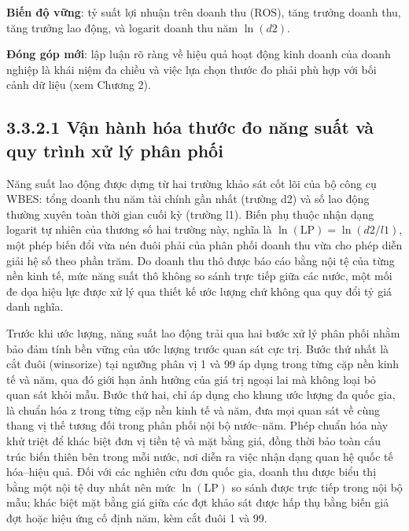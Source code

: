 \documentclass[
  a4paper,
  13pt]{extreport}
\begin{document}
\textbf{Biến độ vững}: tỷ suất lợi nhuận trên doanh thu
(\(\mathrm{ROS}\)), tăng trưởng doanh thu, tăng trưởng lao động, và
logarit doanh thu năm \(\ln(d2)\).

\textbf{Đóng góp mới}: lập luận rõ ràng về hiệu quả hoạt động kinh doanh
của doanh nghiệp là khái niệm đa chiều và việc lựa chọn thước đo phải
phù hợp với bối cảnh dữ liệu (xem Chương 2).

\hypertarget{vux1eadn-huxe0nh-huxf3a-thux1b0ux1edbc-ux111o-nux103ng-suux1ea5t-vuxe0-quy-truxecnh-xux1eed-luxfd-phuxe2n-phux1ed1i}{%
\subsection{3.3.2.1 Vận hành hóa thước đo năng suất và quy trình xử lý
phân
phối}\label{vux1eadn-huxe0nh-huxf3a-thux1b0ux1edbc-ux111o-nux103ng-suux1ea5t-vuxe0-quy-truxecnh-xux1eed-luxfd-phuxe2n-phux1ed1i}}

Năng suất lao động được dựng từ hai trường khảo sát cốt lõi của bộ công
cụ WBES: tổng doanh thu năm tài chính gần nhất (trường d2) và số lao
động thường xuyên toàn thời gian cuối kỳ (trường l1). Biến phụ thuộc
nhận dạng logarit tự nhiên của thương số hai trường này, nghĩa là
\(\ln(\mathrm{LP}) = \ln(d2 / l1)\), một phép biến đổi vừa nén đuôi phải
của phân phối doanh thu vừa cho phép diễn giải hệ số theo phần trăm. Do
doanh thu thô được báo cáo bằng nội tệ của từng nền kinh tế, mức năng
suất thô không so sánh trực tiếp giữa các nước, một mối đe dọa hiệu lực
được xử lý qua thiết kế ước lượng chứ không qua quy đổi tỷ giá danh
nghĩa.

Trước khi ước lượng, năng suất lao động trải qua hai bước xử lý phân
phối nhằm bảo đảm tính bền vững của ước lượng trước quan sát cực trị.
Bước thứ nhất là cắt đuôi (winsorize) tại ngưỡng phân vị 1 và 99 áp dụng
trong từng cặp nền kinh tế và năm, qua đó giới hạn ảnh hưởng của giá trị
ngoại lai mà không loại bỏ quan sát khỏi mẫu. Bước thứ hai, chỉ áp dụng
cho khung ước lượng đa quốc gia, là chuẩn hóa z trong từng cặp nền kinh
tế và năm, đưa mọi quan sát về cùng thang vị thế tương đối trong phân
phối nội bộ nước--năm. Phép chuẩn hóa này khử triệt để khác biệt đơn vị
tiền tệ và mặt bằng giá, đồng thời bảo toàn cấu trúc biến thiên bên
trong mỗi nước, nơi diễn ra việc nhận dạng quan hệ quốc tế hóa--hiệu
quả. Đối với các nghiên cứu đơn quốc gia, doanh thu được biểu thị bằng
một nội tệ duy nhất nên mức \(\ln(\mathrm{LP})\) so sánh được trực tiếp
trong nội bộ mẫu; khác biệt mặt bằng giá giữa các đợt khảo sát được hấp
thụ bằng biến giả đợt hoặc hiệu ứng cố định năm, kèm cắt đuôi 1 và 99.
\end{document}
